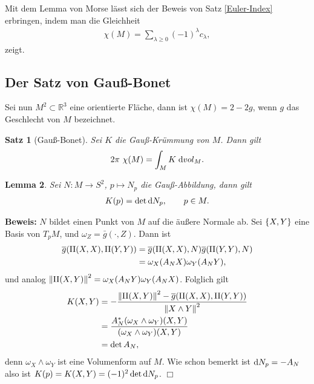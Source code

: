 \documentclass[12pt,a4paper]{article}
\def\R{\mathbb{R}}
\newtheorem{Lemma}{Lemma}[section]
\newtheorem{Satz}[Lemma]{Satz}
\def\proof{\noindent\textbf{Beweis:}\quad}
\def\qed{\quad\hfill\ensuremath{\Box}}
\begin{document}
\bigskip

Mit dem Lemma von Morse l\"asst sich der Beweis von Satz \ref{Euler-Index}
erbringen, indem man die Gleichheit
\begin{align*}
\chi(M) = \sum_{\lambda\ge 0} (-1)^\lambda c_\lambda,
\end{align*}
zeigt.

\subsection{Der Satz von Gau\ss{}-Bonet}

Sei nun $M^2\subset\R^3$ eine orientierte Fl\"ache, dann ist $\chi(M) = 2-2g$,
wenn $g$ das Geschlecht von $M$ bezeichnet.

\begin{Satz}[Gau\ss{}-Bonet]
Sei $K$ die Gau\ss{}-Kr\"ummung von $M$. Dann gilt
\begin{align*}
2\pi\ \chi(M) = \int_M K\;\mathrm{d}vol_M.
\end{align*} 
\end{Satz}

\begin{Lemma}
Sei $N: M\to S^2$, $p\mapsto N_p$ die Gau\ss{}-Abbildung, dann gilt
\begin{align*}
K(p) = \det \mathrm{d} N_p,\qquad p\in M. 
\end{align*}
\end{Lemma}

\proof
$N$ bildet einen Punkt von $M$ auf die \"au\ss{}ere Normale ab. Sei $\{X,Y\}$
eine Basis von $T_pM$, und $\omega_{Z} = \bar{g}(\cdot,Z)$. Dann ist
\begin{align*}
\overline{g}(\mathrm{II}(X,X),\mathrm{II}(Y,Y))
&= \overline{g}(\mathrm{II}(X,X),N)\overline{g}(\mathrm{II}(Y,Y),N)\\
&= \omega_X(A_N X)\omega_Y(A_NY),
\end{align*}
und analog $\left\|\mathrm{II}(X,Y)\right\|^2 = \omega_X(A_NY)\omega_Y(A_N X)$. Folglich gilt
\begin{align*}
K(X,Y) &= -\frac{\left\|\mathrm{II}(X,Y)\right\|^2-\overline{g}(\mathrm{II}(X,X),\mathrm{II}(Y,Y))}
{\left\|X\wedge Y\right\|^2} \\ &=
\frac{A_N^*(\omega_X\wedge\omega_Y)(X,Y)}{(\omega_X\wedge\omega_Y)(X,Y)}\\
&= \det A_N,
\end{align*}
denn $\omega_X\wedge\omega_Y$ ist eine Volumenform auf $M$. Wie schon bemerkt
ist $\mathrm{d} N_p =  -A_N$ also ist $K(p) = K(X,Y) = (-1)^2\det \mathrm{d} N_p$.
\qed

\bigskip
\end{document}
